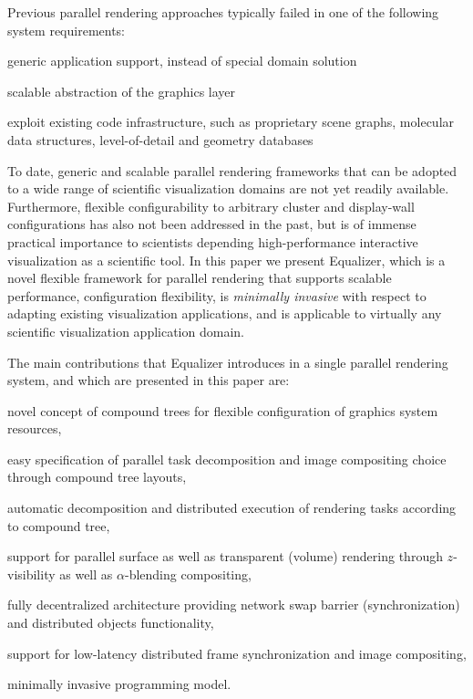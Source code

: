 \documentclass[10pt,journal,compsoc]{IEEEtran}
\begin{document}
Previous parallel rendering approaches typically failed in one of the following system requirements:
%
\begin{compactenum}\renewcommand{\labelenumi}{\alph{enumi})}
\item generic application support, instead of special domain solution
\item scalable abstraction of the graphics layer
\item exploit existing code infrastructure, such as proprietary scene graphs, molecular data structures, level-of-detail and geometry databases
\end{compactenum}

To date, generic and scalable parallel rendering frameworks  that can be adopted to a wide range of scientific visualization domains are not yet readily available. Furthermore, flexible
configurability to arbitrary cluster and display-wall configurations has also not been addressed in the past, but is of immense practical importance to scientists depending high-performance interactive visualization as a scientific tool. In this paper we present Equalizer, which is a novel flexible framework for parallel rendering that supports scalable performance, configuration flexibility, is {\em minimally invasive} with respect to adapting existing visualization applications, and is applicable to virtually any scientific visualization application domain.

The main contributions that Equalizer introduces in a single parallel rendering system, and which are presented in this paper are:
%
\begin{compactenum}\renewcommand{\labelenumi}{\roman{enumi})}
\item novel concept of compound trees for flexible configuration of graphics system resources,
\item easy specification of parallel task decomposition and image compositing choice through compound tree layouts,
\item automatic decomposition and distributed execution of rendering tasks according to compound tree,
\item support for parallel surface as well as transparent (volume) rendering through $z$-visibility as well as $\alpha$-blending compositing,
\item fully decentralized architecture providing network swap barrier (synchronization) and distributed objects functionality,
\item support for low-latency distributed frame synchronization and image compositing,
\item minimally invasive programming model.
\end{compactenum}
\end{document}
